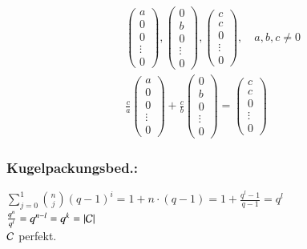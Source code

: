 \begin{align*}
	&\begin{pmatrix}
	a \\ 0 \\ 0 \\ \vdots \\ 0
	\end{pmatrix},
	\begin{pmatrix}
	0 \\ b \\ 0 \\ \vdots \\ 0
	\end{pmatrix},
	\begin{pmatrix}
	c \\ c \\ 0 \\ \vdots \\ 0
	\end{pmatrix}, \quad a,b,c \neq 0
	\\
	&\frac{c}{a}
	\begin{pmatrix}
	a \\ 0 \\ 0 \\ \vdots \\ 0
	\end{pmatrix} +
	\frac{c}{b}
	\begin{pmatrix}
	0 \\ b \\ 0 \\ \vdots \\ 0
	\end{pmatrix} =
	\begin{pmatrix}
	c \\ c \\ 0 \\ \vdots \\ 0
	\end{pmatrix}
\end{align*}
\subsubsection{Kugelpackungsbed.:}
$\sum_{j=0}^1{\binom{n}{j} (q-1)^i}=1 + n \cdot (q-1) = 1 + \frac{q^l-1}{q-1}=q^l$\\
$\frac{q^n}{q^l}=q^{n-l}=q^k = \left| \mathcal{C} \right|$\\
$\mathcal{C}$ perfekt.

%
%


%
%
